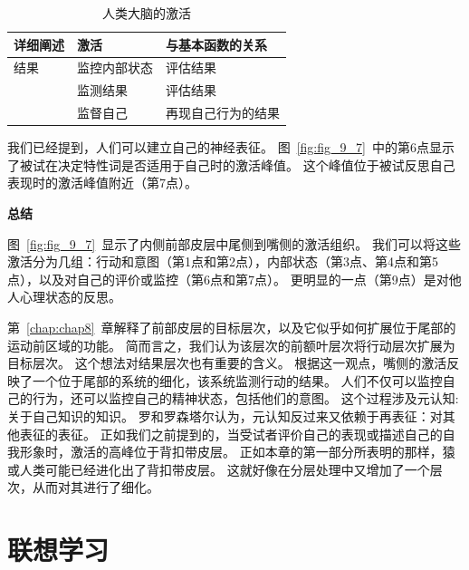\begin{table}[htbp] 
	\newcommand{\tabincell}[2]{\begin{tabular}{@{}#1@{}}#2\end{tabular}} %
	\centering
	\caption{人类大脑的激活\label{tab:9_5}}
	\renewcommand\arraystretch{1.5}	%
	\begin{tabular}{lll}
		\toprule
		详细阐述 & 激活 & 与基本函数的关系\\
		\midrule
		结果 & 监控内部状态 & 评估结果  \\
		& 监测结果 & 评估结果 \\
		& 监督自己 & 再现自己行为的结果 \\
		\bottomrule
		
	\end{tabular}%
\end{table}%


我们已经提到，人们可以建立自己的神经表征。
图~\ref{fig:fig_9_7}~中的第6点显示了被试在决定特性词是否适用于自己时的激活峰值\cite{ochsner2005neural}。
这个峰值位于被试反思自己表现时的激活峰值附近（第7点）。
\par


\textbf{总结}
\par
图~\ref{fig:fig_9_7}~显示了内侧前部皮层中尾侧到嘴侧的激活组织。
我们可以将这些激活分为几组：行动和意图（第1点和第2点），内部状态（第3点、第4点和第5点），以及对自己的评价或监控（第6点和第7点）。
更明显的一点（第9点）是对他人心理状态的反思。
\par


第~\ref{chap:chap8}~章解释了前部皮层的目标层次，以及它似乎如何扩展位于尾部的运动前区域的功能。
简而言之，我们认为该层次的前额叶层次将行动层次扩展为目标层次。
这个想法对结果层次也有重要的含义。
根据这一观点，嘴侧的激活反映了一个位于尾部的系统的细化，该系统监测行动的结果。
人们不仅可以监控自己的行为，还可以监控自己的精神状态，包括他们的意图。
这个过程涉及元认知:关于自己知识的知识。
罗和罗森塔尔\cite{lau2011empirical}认为，元认知反过来又依赖于再表征：对其他表征的表征。
正如我们之前提到的，当受试者评价自己的表现或描述自己的自我形象时，激活的高峰位于背扣带皮层。
正如本章的第一部分所表明的那样，猿或人类可能已经进化出了背扣带皮层。
这就好像在分层处理中又增加了一个层次，从而对其进行了细化。



\section{联想学习}
\par

